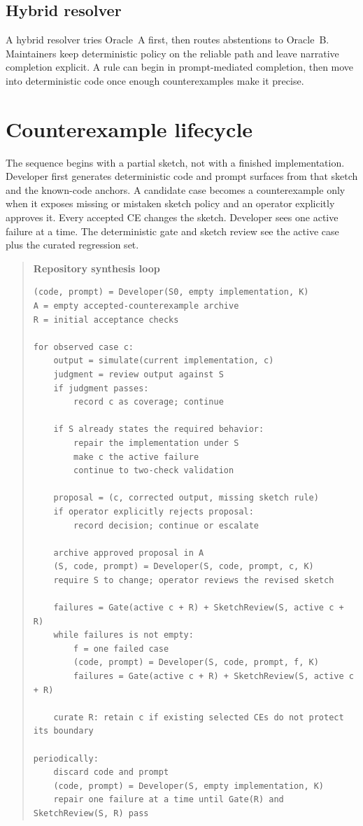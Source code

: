 \documentclass[11pt]{article}
\begin{document}
\subsection{Hybrid resolver}

A hybrid resolver tries Oracle~A first, then routes abstentions to Oracle~B.  Maintainers
keep deterministic policy on the reliable path and leave narrative completion explicit.
A rule can begin in prompt-mediated completion, then move into deterministic code once
enough counterexamples make it precise.

\section{Counterexample lifecycle}
\label{sec:lifecycle}

The sequence begins with a partial sketch, not with a finished implementation.  Developer first
generates deterministic code and prompt surfaces from that sketch and the known-code anchors.  A
candidate case becomes a counterexample only when it exposes missing or mistaken sketch policy
and an operator explicitly approves it.  Every accepted CE changes the sketch.  Developer sees
one active failure at a time.  The deterministic gate and sketch review see the active case plus
the curated regression set.

\begin{quote}
\textbf{Repository synthesis loop}
\begin{verbatim}
(code, prompt) = Developer(S0, empty implementation, K)
A = empty accepted-counterexample archive
R = initial acceptance checks

for observed case c:
    output = simulate(current implementation, c)
    judgment = review output against S
    if judgment passes:
        record c as coverage; continue

    if S already states the required behavior:
        repair the implementation under S
        make c the active failure
        continue to two-check validation

    proposal = (c, corrected output, missing sketch rule)
    if operator explicitly rejects proposal:
        record decision; continue or escalate

    archive approved proposal in A
    (S, code, prompt) = Developer(S, code, prompt, c, K)
    require S to change; operator reviews the revised sketch

    failures = Gate(active c + R) + SketchReview(S, active c + R)
    while failures is not empty:
        f = one failed case
        (code, prompt) = Developer(S, code, prompt, f, K)
        failures = Gate(active c + R) + SketchReview(S, active c + R)

    curate R: retain c if existing selected CEs do not protect its boundary

periodically:
    discard code and prompt
    (code, prompt) = Developer(S, empty implementation, K)
    repair one failure at a time until Gate(R) and SketchReview(S, R) pass
\end{verbatim}
\end{quote}
\end{document}
